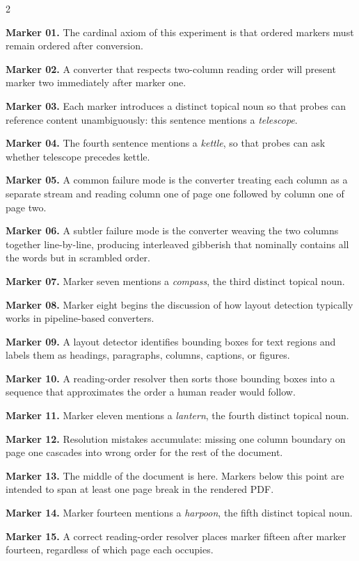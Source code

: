\documentclass[12pt]{article}
\begin{document}
\begin{multicols}{2}

\noindent
\textbf{Marker 01.} The cardinal axiom of this experiment is that ordered
markers must remain ordered after conversion.

\textbf{Marker 02.} A converter that respects two-column reading order will
present marker two immediately after marker one.

\textbf{Marker 03.} Each marker introduces a distinct topical noun so that
probes can reference content unambiguously: this sentence mentions a
\emph{telescope}.

\textbf{Marker 04.} The fourth sentence mentions a \emph{kettle}, so that
probes can ask whether telescope precedes kettle.

\textbf{Marker 05.} A common failure mode is the converter treating each
column as a separate stream and reading column one of page one followed by
column one of page two.

\textbf{Marker 06.} A subtler failure mode is the converter weaving the two
columns together line-by-line, producing interleaved gibberish that nominally
contains all the words but in scrambled order.

\textbf{Marker 07.} Marker seven mentions a \emph{compass}, the third
distinct topical noun.

\textbf{Marker 08.} Marker eight begins the discussion of how layout
detection typically works in pipeline-based converters.

\textbf{Marker 09.} A layout detector identifies bounding boxes for text
regions and labels them as headings, paragraphs, columns, captions, or
figures.

\textbf{Marker 10.} A reading-order resolver then sorts those bounding boxes
into a sequence that approximates the order a human reader would follow.

\textbf{Marker 11.} Marker eleven mentions a \emph{lantern}, the fourth
distinct topical noun.

\textbf{Marker 12.} Resolution mistakes accumulate: missing one column
boundary on page one cascades into wrong order for the rest of the document.

\textbf{Marker 13.} The middle of the document is here. Markers below this
point are intended to span at least one page break in the rendered PDF.

\textbf{Marker 14.} Marker fourteen mentions a \emph{harpoon}, the fifth
distinct topical noun.

\textbf{Marker 15.} A correct reading-order resolver places marker fifteen
after marker fourteen, regardless of which page each occupies.


\end{multicols}
\end{document}
